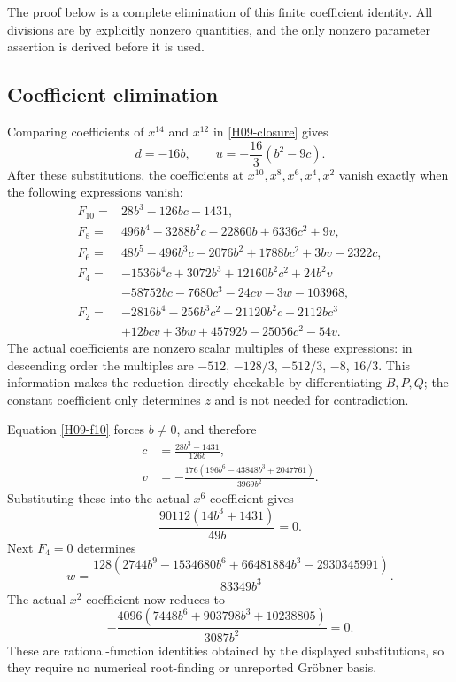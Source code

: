\documentclass[11pt,a4paper]{article}
\theoremstyle{definition}\newtheorem{definition}[theorem]{Definition}
\theoremstyle{remark}\newtheorem{remark}[theorem]{Remark}
\numberwithin{equation}{section}
\begin{document}
The proof below is a complete elimination of this finite coefficient identity. All divisions are by explicitly nonzero quantities, and the only nonzero parameter assertion is derived before it is used.
\subsection{Coefficient elimination}\label{H09-sec-4}
Comparing coefficients of $x^{14}$ and $x^{12}$ in \eqref{H09-closure} gives
\begin{equation}\label{H09-du}
d=-16b,\qquad u=-\frac{16}{3}(b^2-9c).
\end{equation}
After these substitutions, the coefficients at $x^{10},x^8,x^6,x^4,x^2$ vanish exactly when the following expressions vanish:
\begin{align}
F_{10}={}&28b^3-126bc-1431,\label{H09-f10}\\
F_8={}&496b^4-3288b^2c-22860b+6336c^2+9v,\nonumber\\
F_6={}&48b^5-496b^3c-2076b^2+1788bc^2+3bv-2322c,\nonumber\\
F_4={}&-1536b^4c+3072b^3+12160b^2c^2+24b^2v\nonumber\\
&-58752bc-7680c^3-24cv-3w-103968,\nonumber\\
F_2={}&-2816b^4-256b^3c^2+21120b^2c+2112bc^3\nonumber\\
&+12bcv+3bw+45792b-25056c^2-54v.\nonumber
\end{align}
The actual coefficients are nonzero scalar multiples of these expressions: in descending order the multiples are $-512$, $-128/3$, $-512/3$, $-8$, $16/3$. This information makes the reduction directly checkable by differentiating $B,P,Q$; the constant coefficient only determines $z$ and is not needed for contradiction.

Equation \eqref{H09-f10} forces $b\ne0$, and therefore
\begin{align*}
c&=\frac{28b^3-1431}{126b},\\
v&=-\frac{176(196b^6-43848b^3+2047761)}{3969b^2}.
\end{align*}
Substituting these into the actual $x^6$ coefficient gives
\begin{equation}\label{H09-first}
\frac{90112(14b^3+1431)}{49b}=0.
\end{equation}
Next $F_4=0$ determines
\[w=\frac{128(2744b^9-1534680b^6+66481884b^3-2930345991)}{83349b^3}.
\]
The actual $x^2$ coefficient now reduces to
\begin{equation}\label{H09-second}
-\frac{4096(7448b^6+903798b^3+10238805)}{3087b^2}=0.
\end{equation}
These are rational-function identities obtained by the displayed substitutions, so they require no numerical root-finding or unreported Gr\"obner basis.
\end{document}
